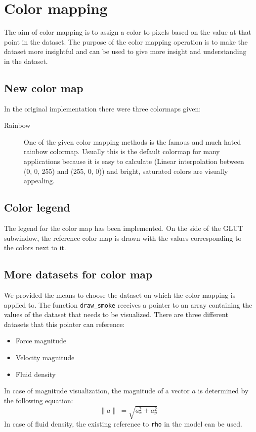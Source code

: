 \section{Color mapping}
	\label{sec:color_mapping}
	The aim of color mapping is to assign a color to pixels based on the value at that point in the dataset. The purpose of the color mapping operation is to make the dataset more insightful and can be used to give more insight and understanding in the dataset.
	\subsection*{New color map}
		In the original implementation there were three colormaps given:
		\begin{description}
			\item[Rainbow] One of the given color mapping methods is the famous and much hated\cite{RainbowMisleading} rainbow colormap. Usually this is the default colormap for many applications because it is easy to calculate (Linear interpolation between (0, 0, 255) and (255, 0, 0)) and bright, saturated colors are visually appealing.
		\end{description}
	\subsection*{Color legend}
		The legend for the color map has been implemented.
		On the side of the GLUT subwindow, the reference color map is drawn with the values corresponding to the colors next to it.
	\subsection*{More datasets for color map}
		We provided the means to choose the dataset on which the color mapping is applied to.
		The function \texttt{draw\_smoke} receives a pointer to an array containing the values of the dataset that needs to be visualized.
		There are three different datasets that this pointer can reference:
		\begin{itemize}
			\item Force magnitude
			\item Velocity magnitude
			\item Fluid density
		\end{itemize}
		In case of magnitude visualization, the magnitude of a vector \(a\) is determined by the following equation:
		\[\| a \|\ = \sqrt{a_x^2 + a_y^2}\]
		In case of fluid density, the existing reference to \texttt{rho} in the model can be used.
